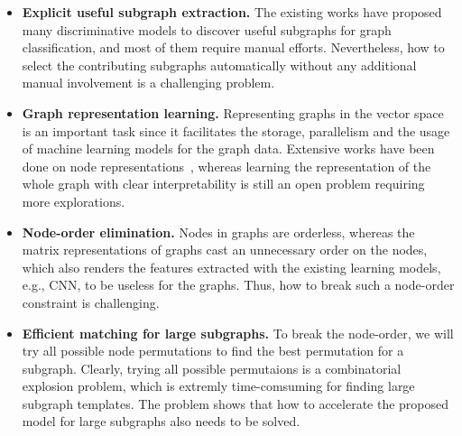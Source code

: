 \documentclass{article} \usepackage{iclr2020_conference,times}
\begin{document}
\begin{itemize}


		
	\item \textbf{Explicit useful subgraph extraction.} The existing works have proposed many discriminative models to discover useful subgraphs for graph classification, and most of them require manual efforts. Nevertheless, how to select the contributing subgraphs automatically without any additional manual involvement is a challenging problem.
\item \textbf{Graph representation learning.}  Representing graphs in the vector space is an important task since it facilitates the storage, parallelism and the usage of machine learning models for the graph data. Extensive works have been done on node representations~\cite{grover2016node2vec, lin2015learning, lai2017prune, hamilton2017inductive}, whereas learning the representation of the whole graph with clear interpretability is still an open problem requiring more explorations. 
	\item \textbf{Node-order elimination.}  Nodes in graphs are orderless, whereas the matrix representations of graphs cast an unnecessary order on the nodes, which also renders the features extracted with the existing learning models, e.g., CNN, to be useless for the graphs. Thus, how to break such a node-order constraint is challenging.
	
	\item \textbf{Efficient matching for large subgraphs.}  To break the node-order, we will try all possible node permutations  to find the best permutation for a subgraph. Clearly, trying all possible permutaions is a combinatorial explosion problem, which is extremly time-comsuming for finding large subgraph templates.  The problem shows that how  to accelerate the proposed model for large subgraphs also needs to be solved.

\end{itemize}
\end{document}
